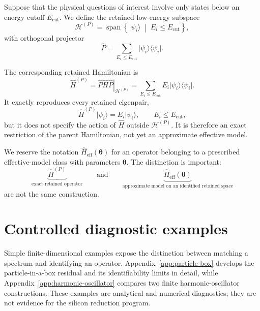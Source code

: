 Suppose that the physical questions of interest involve only states below an
energy cutoff $E_{\mathrm{cut}}$. We define the retained low-energy subspace
\begin{equation}
    \mathcal H^{(P)}
    =
    \operatorname{span}
    \left\{
        \lvert\psi_i\rangle
        \;\middle|\;
        E_i\leq E_{\mathrm{cut}}
    \right\},
\end{equation}
with orthogonal projector
\begin{equation}
    \hat P
    =
    \sum_{E_i\leq E_{\mathrm{cut}}}
    \lvert\psi_i\rangle\langle\psi_i\rvert.
\end{equation}

The corresponding retained Hamiltonian is
\begin{equation}
    \hat H^{(P)}
    =
    \left.
        \hat P\hat H\hat P
    \right|_{\mathcal H^{(P)}}
    =
    \sum_{E_i\leq E_{\mathrm{cut}}}
    E_i\lvert\psi_i\rangle\langle\psi_i\rvert.
\end{equation}
It exactly reproduces every retained eigenpair,
\begin{equation}
    \hat H^{(P)}\lvert\psi_i\rangle
    =
    E_i\lvert\psi_i\rangle,
    \qquad
    E_i\leq E_{\mathrm{cut}},
\end{equation}
but it does not specify the action of $\hat H$ outside
$\mathcal H^{(P)}$. It is therefore an exact restriction of the parent
Hamiltonian, not yet an approximate effective model.

We reserve the notation $\hat H_{\mathrm{eff}}(\boldsymbol\theta)$ for an
operator belonging to a prescribed effective-model class with parameters
$\boldsymbol\theta$. The distinction is important:
\begin{equation}
    \underbrace{\hat H^{(P)}}_{\text{exact retained operator}}
    \qquad\text{and}\qquad
    \underbrace{\hat H_{\mathrm{eff}}(\boldsymbol\theta)}_{
        \text{approximate model on an identified retained space}}
\end{equation}
are not the same construction.

\section{Controlled diagnostic examples}


Simple finite-dimensional examples expose the distinction between matching a
spectrum and identifying an operator. Appendix~\ref{app:particle-box} develops
the particle-in-a-box residual and its identifiability limits in detail, while
Appendix~\ref{app:harmonic-oscillator} compares two finite harmonic-oscillator
constructions. These examples are analytical and numerical diagnostics; they
are not evidence for the silicon reduction program.

